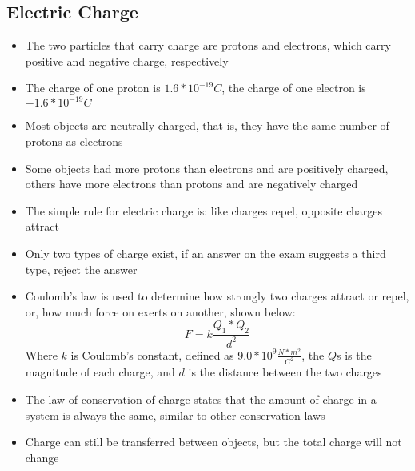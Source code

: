 \subsection{Electric Charge}
\begin{itemize}
    \item The two particles that carry charge are protons and electrons, which carry positive and negative charge, respectively
    \item The charge of one proton is \(1.6*10^{-19}C\), the charge of one electron is \(-1.6*10^{-19}C\)
    \item Most objects are neutrally charged, that is, they have the same number of protons as electrons
    \item Some objects had more protons than electrons and are positively charged, others have more electrons than protons and are negatively charged
    \item The simple rule for electric charge is: like charges repel, opposite charges attract
    \item Only two types of charge exist, if an answer on the exam suggests a third type, reject the answer
    \item Coulomb's law is used to determine how strongly two charges attract or repel, or, how much force on exerts on another, shown below: \[F=k\frac{Q_1*Q_2}{d^2}\] Where \(k\) is Coulomb's constant, defined as \(9.0*10^9\frac{N*m^2}{C^2}\), the \(Q\)s is the magnitude of each charge, and \(d\) is the distance between the two charges
    \item The law of conservation of charge states that the amount of charge in a system is always the same, similar to other conservation laws
    \item Charge can still be transferred between objects, but the total charge will not change
\end{itemize}

